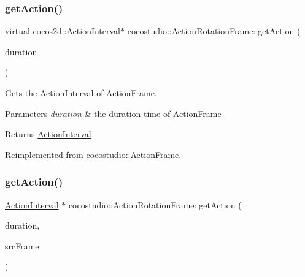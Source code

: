 \subsubsection{\texorpdfstring{get\+Action()}{getAction()}\hspace{0.1cm}{\footnotesize\ttfamily [2/4]}}
{\footnotesize\ttfamily virtual cocos2d\+::\+Action\+Interval$\ast$ cocostudio\+::\+Action\+Rotation\+Frame\+::get\+Action (\begin{DoxyParamCaption}\item[{float}]{duration }\end{DoxyParamCaption})\hspace{0.3cm}{\ttfamily [virtual]}}

Gets the \hyperlink{classActionInterval}{Action\+Interval} of \hyperlink{classcocostudio_1_1ActionFrame}{Action\+Frame}.


\begin{DoxyParams}{Parameters}
{\em duration} & the duration time of \hyperlink{classcocostudio_1_1ActionFrame}{Action\+Frame}\\
\hline
\end{DoxyParams}
\begin{DoxyReturn}{Returns}
\hyperlink{classActionInterval}{Action\+Interval} 
\end{DoxyReturn}


Reimplemented from \hyperlink{classcocostudio_1_1ActionFrame_a375216a44f6643d5e771299b1236dc51}{cocostudio\+::\+Action\+Frame}.

\mbox{\label{classcocostudio_1_1ActionRotationFrame_adb56d8ed3cc97f590cba9429602ef918}} 
\subsubsection{\texorpdfstring{get\+Action()}{getAction()}\hspace{0.1cm}{\footnotesize\ttfamily [3/4]}}
{\footnotesize\ttfamily \hyperlink{classActionInterval}{Action\+Interval} $\ast$ cocostudio\+::\+Action\+Rotation\+Frame\+::get\+Action (\begin{DoxyParamCaption}\item[{float}]{duration,  }\item[{\hyperlink{classcocostudio_1_1ActionFrame}{Action\+Frame} $\ast$}]{src\+Frame }\end{DoxyParamCaption})\hspace{0.3cm}{\ttfamily [virtual]}}

